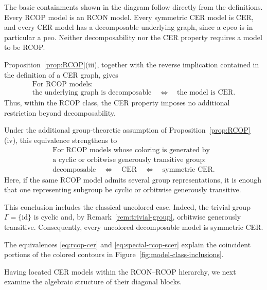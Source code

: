 \documentclass[12pt]{amsart}
\theoremstyle{plain}
\theoremstyle{definition}
\theoremstyle{remark}
\newcommand{\1}{\mathbf{1}}
\begin{document}
The basic containments shown in the diagram follow directly from the
definitions. Every RCOP model is an RCON model. Every symmetric CER model
is CER, and every CER model has a decomposable underlying graph, since a
cpeo is in particular a peo. Neither decomposability nor the CER property
requires a model to be RCOP.

Proposition~\ref{prop:RCOP}(iii), together with the reverse implication contained
in the definition of a CER graph, gives
\begin{equation}
\label{eq:rcop-cer}
\begin{gathered}
\text{For RCOP models:}\\[3pt]
\text{the underlying graph is decomposable}
\quad\Longleftrightarrow\quad
\text{the model is CER}.
\end{gathered}
\end{equation}
Thus, within the RCOP class, the CER property imposes no additional
restriction beyond decomposability.

Under the additional group-theoretic assumption of
Proposition~\ref{prop:RCOP}(iv), this equivalence strengthens to
\begin{equation}
\label{eq:special-rcop-scer}
\begin{gathered}
\text{For RCOP models whose coloring is generated by}\\[-1pt]
\text{a cyclic or orbitwise generously transitive group:}\\[3pt]
\text{decomposable}
\quad\Longleftrightarrow\quad
\text{CER}
\quad\Longleftrightarrow\quad
\text{symmetric CER}.
\end{gathered}
\end{equation}
Here, if the same RCOP model admits several group representations, it is
enough that one representing subgroup be cyclic or orbitwise generously
transitive.

This conclusion includes the classical uncolored case.
Indeed, the trivial group $\Gamma=\{\mathrm{id}\}$ is cyclic and, by
Remark~\ref{rem:trivial-group}, orbitwise generously transitive.
Consequently, every uncolored decomposable model is symmetric CER.

The equivalences \eqref{eq:rcop-cer} and
\eqref{eq:special-rcop-scer} explain the coincident portions of
the colored contours in Figure~\ref{fig:model-class-inclusions}.

Having located CER models within the RCON--RCOP hierarchy, we next examine
the algebraic structure of their diagonal blocks.
\end{document}
